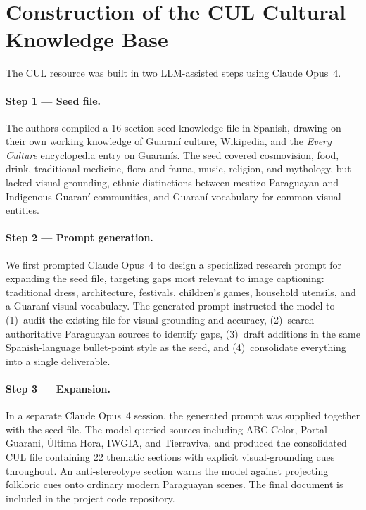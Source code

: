 \documentclass[11pt]{article}
\begin{document}
\section{Construction of the CUL Cultural Knowledge Base}
\label{app:cul}

The CUL resource was built in two LLM-assisted steps using Claude Opus~4.

\paragraph{Step 1 --- Seed file.}
The authors compiled a 16-section seed knowledge file in Spanish, drawing on their own working knowledge of Guaran\'{i} culture, Wikipedia, and the \textit{Every Culture} encyclopedia entry on Guaran\'{i}s. The seed covered cosmovision, food, drink, traditional medicine, flora and fauna, music, religion, and mythology, but lacked visual grounding, ethnic distinctions between mestizo Paraguayan and Indigenous Guaran\'{i} communities, and Guaran\'{i} vocabulary for common visual entities.

\paragraph{Step 2 --- Prompt generation.}
We first prompted Claude Opus~4 to design a specialized research prompt for expanding the seed file, targeting gaps most relevant to image captioning: traditional dress, architecture, festivals, children's games, household utensils, and a Guaran\'{i} visual vocabulary. The generated prompt instructed the model to (1)~audit the existing file for visual grounding and accuracy, (2)~search authoritative Paraguayan sources to identify gaps, (3)~draft additions in the same Spanish-language bullet-point style as the seed, and (4)~consolidate everything into a single deliverable.

\paragraph{Step 3 --- Expansion.}
In a separate Claude Opus~4 session, the generated prompt was supplied together with the seed file. The model queried sources including ABC Color, Portal Guarani, \'Ultima Hora, IWGIA, and Tierraviva, and produced the consolidated CUL file containing 22 thematic sections with explicit visual-grounding cues throughout. An anti-stereotype section warns the model against projecting folkloric cues onto ordinary modern Paraguayan scenes. The final document is included in the project code repository.
\end{document}
